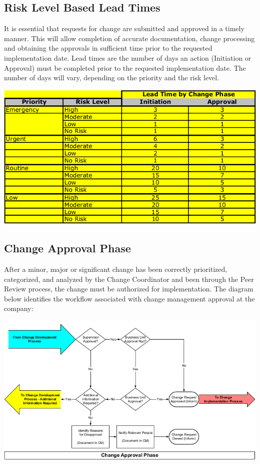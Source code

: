 \documentclass[a4]{article}
\begin{document}
\begin{multicols}{3}
\subsection{Risk Level Based Lead Times}
It is essential that requests for change are submitted and approved in a timely manner. This will allow
completion of accurate documentation, change processing and obtaining the approvals in sufficient time
prior to the requested implementation date.
Lead times are the number of days an action (Initiation or Approval) must be completed prior to the
requested implementation date. The number of days will vary, depending on the priority and the risk
level.
\begin{center}
    \begin{minipage}{\columnwidth}
        \includegraphics[width=\columnwidth]{risk-based-lead-times.png}
    \end{minipage}
\end{center}

\subsection{Change Approval Phase}
After a minor, major or significant change has been correctly prioritized, categorized, and analyzed by the
Change Coordinator and been through the Peer Review process, the change must be authorized for
implementation. The diagram below identifies the workflow associated with change management
approval at the company:
\begin{center}
    \begin{minipage}{\columnwidth}
        \includegraphics[width=\columnwidth]{change-approval-phase.png}
    \end{minipage}
\end{center}


\end{multicols}
\end{document}
